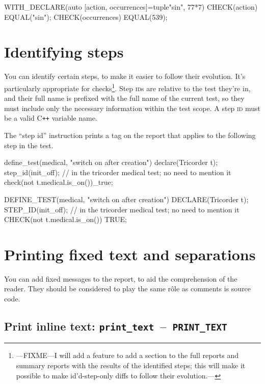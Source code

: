 \documentclass[twoside, a4paper, article]{memoir}
\newcommand*\testudocolor{\color{red!80!blue}}
\newcommand*\testudo[1]{\texttt{\testudocolor{}#1}}
\newcommand*\testudopair[2]{\testudo{#1}~--~\testudo{#2}}
\newcommand\subsectiontestudopair[3]{%
  \subsection[#1]{#1: \testudopair{#2}{#3}}}
\newcommand*\Cpp{C\texttt{++}}
\begin{document}
\begin{cpplisting}
WITH_DECLARE(auto [action, occurrences]=tuple{"sin", 77*7})
{
  CHECK(action) EQUAL("sin");
  CHECK(occurrences) EQUAL(539);
}
\end{cpplisting}

\section{Identifying steps}
\label{sec:identifying-steps}

You can identify certain steps, to make it easier to follow their evolution.
It's particularly appropriate for checks\footnote{---FIXME---I will add a
  feature to add a section to the full reports and summary reports with the
  results of the identified steps; this will make it possible to make
  id'd-step-only diffs to follow their evolution.---}.  Step \textsc{id}s are
relative to the test they're in, and their full name is prefixed with the full
name of the current test, so they must include only the necessary information
within the test scope.  A step \textsc{id} must be a valid \Cpp{} variable
name.

The ``step id'' instruction prints a tag on the report that applies to the
following step in the test.
\begin{cpplisting}
define_test(medical, "switch on after creation") {
  declare(Tricorder t);
  step_id(init_off); // in the tricorder medical test; no need to mention it
  check(not t.medical.is_on())_true;
}
\end{cpplisting}

\begin{cpplisting}
DEFINE_TEST(medical, "switch on after creation") {
  DECLARE(Tricorder t);
  STEP_ID(init_off); // in the tricorder medical test; no need to mention it
  CHECK(not t.medical.is_on()) TRUE;
}
\end{cpplisting}


\section{Printing fixed text and separations}
\label{sec:printing-text-separations}

You can add fixed messages to the report, to aid the comprehension of the
reader.  They should be considered to play the same rôle as comments is source
code.

\subsectiontestudopair{Print inline text}{print\_text}{PRINT\_TEXT}
\label{sec:print-inline-text}
\end{document}

